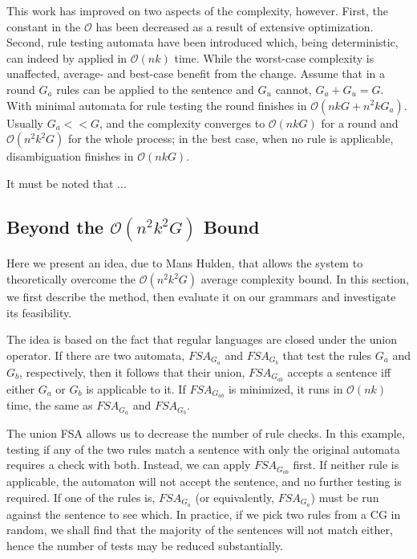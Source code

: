 \documentclass{article}
\begin{document}
This work has improved on two aspects of the complexity, however. First, the
constant in the $\mathcal{O}$ has been decreased as a result of extensive
optimization. Second, rule testing automata have been introduced which, being
deterministic, can indeed by applied in $\mathcal{O}(nk)$ time.
While the worst-case complexity is unaffected, average- and best-case benefit
from the change. Assume that in a round $G_a$ rules can be applied to the
sentence and $G_u$ cannot, $G_a + G_u = G$. With minimal automata for
rule testing the round finishes in $\mathcal{O}(nkG + n^2kG_a)$. Usually
$G_a << G$, and the complexity converges to $\mathcal{O}(nkG)$ for a round
and $\mathcal{O}(n^2k^2G)$ for the whole process; in the best case, when no rule
is applicable, disambiguation finishes in $\mathcal{O}(nkG)$.

It must be noted that ... %


\subsection{Beyond the $\mathcal{O}(n^2k^2G)$ Bound}
\label{sec:idea}

Here we present an idea, due to Mans Hulden, that allows the system to
theoretically overcome the $\mathcal{O}(n^2k^2G)$ average complexity bound. In
this section, we first describe the method, then evaluate it on our grammars and
investigate its feasibility.

The idea is based on the fact that regular languages are closed under the union
operator. If there are two automata, $FSA_{G_a}$ and $FSA_{G_b}$ that test the
rules $G_a$ and $G_b$, respectively, then it follows that their union,
$FSA_{G_{ab}}$ accepts a sentence iff either $G_a$ or $G_b$ is applicable to it.
If $FSA_{G_{ab}}$ is minimized, it runs in $\mathcal{O}(nk)$ time, the same as
$FSA_{G_a}$ and $FSA_{G_b}$.

The union FSA allows us to decrease the number of rule checks. In this example,
testing if any of the two rules match a sentence with only the original
automata requires a check with both. Instead, we can apply $FSA_{G_{ab}}$ first.
If neither rule is applicable, the automaton will not accept the sentence, and
no further testing is required. If one of the rules is, $FSA_{G_a}$ (or
equivalently, $FSA_{G_a}$) must be run against the sentence to see which. In
practice, if we pick two rules from a CG in random, we shall find that the
majority of the sentences will not match either, hence the number of tests may
be reduced substantially.
\end{document}
